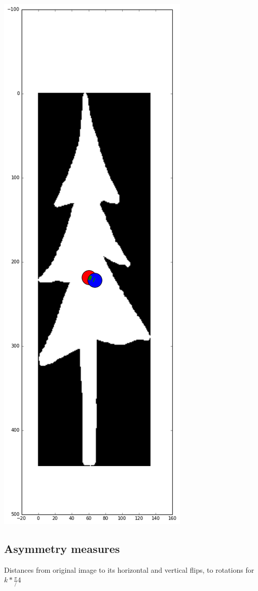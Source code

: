 \documentclass[12pt]{article}
\begin{document}
\includegraphics[scale=0.26]{tree_centroid.png}

\subsection{Asymmetry measures}
Distances from original image to its horizontal and vertical flips, to rotations for $k*\frac{\pi}/4$
 
\end{document}
